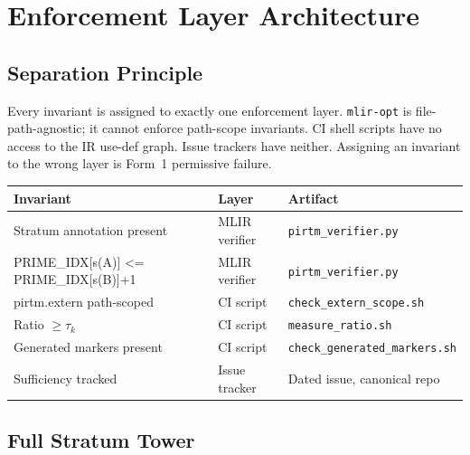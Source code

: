 \documentclass[11pt,letterpaper]{article}
\theoremstyle{pirtmthm}
\theoremstyle{remark}
\begin{document}
\section{Enforcement Layer Architecture}

\subsection{Separation Principle}

Every invariant is assigned to exactly one enforcement layer.
\texttt{mlir-opt} is file-path-agnostic; it cannot enforce path-scope invariants.
CI shell scripts have no access to the IR use-def graph.
Issue trackers have neither.
Assigning an invariant to the wrong layer is Form~1 permissive failure.

\begin{center}
\renewcommand{\arraystretch}{1.3}
\begin{tabular}{@{}>{\small\ttfamily}p{4.4cm}p{3.0cm}p{3.6cm}@{}}
  \toprule
  \textrm{Invariant} & \textrm{Layer} & \textrm{Artifact} \\
  \midrule
  Stratum annotation present         & MLIR verifier & \texttt{pirtm\_verifier.py} \\
  PRIME\_IDX[s(A)] <= PRIME\_IDX[s(B)]+1 & MLIR verifier & \texttt{pirtm\_verifier.py} \\
  pirtm.extern path-scoped           & CI script & \texttt{check\_extern\_scope.sh} \\
  Ratio $\geq \tau_k$                & CI script & \texttt{measure\_ratio.sh} \\
  Generated markers present          & CI script & \texttt{check\_generated\_markers.sh} \\
  Sufficiency tracked                & Issue tracker & Dated issue, canonical repo \\
  \bottomrule
\end{tabular}
\end{center}

\subsection{Full Stratum Tower}
\end{document}
